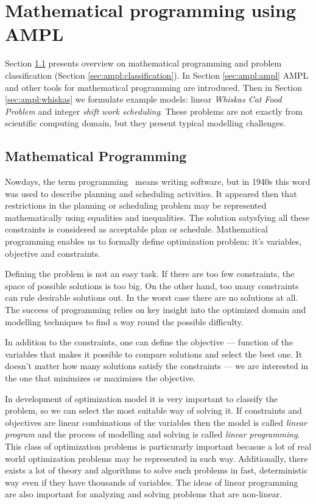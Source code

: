 \chapter{Mathematical programming using AMPL}
\label{chap:ampl} 

Section \ref{sec:ampl:mathprog} presents overview on mathematical programming and problem classification (Section \ref{sec:ampl:classification}). In Section \ref{sec:ampl:ampl} AMPL and other tools for mathematical programming are introduced. Then in Section \ref{sec:ampl:whiskas} we formulate example models: linear \emph{Whiskas Cat Food Problem} and integer \emph{shift work scheduling}. These problems are not exactly from scientific computing domain, but they present typical modelling challenges.

\section{Mathematical Programming}
\label{sec:ampl:mathprog}

Nowdays, the term programming~\cite{Programming} means writing software, but in 1940s this word was used to describe planning and scheduling activities. It appeared then that restrictions in the planning or scheduling problem may be represented mathematically using equalities and inequalities.  The solution satysfying all these constraints is considered as acceptable plan or schedule.  Mathematical programming enables us to formally define optimization problem: it's variables, objective and constraints.

Defining the problem is not an easy task. If there are too few constraints, the space of possible solutions is too big. On the other hand, too many constraints can rule desirable solutions out. In the worst case there are no solutions at all. The success of programming relies on key insight into the optimized domain and modelling techniques to find a way round the possible difficulty. 

In addition to the constraints, one can define the objective --- function of the variables that makes it possible to compare solutions and select the best one. It doesn't matter how many solutions satisfy the constraints --- we are interested in the one that minimizes or maximizes the objective.

In development of optimization model it is very important to classify the problem, so we can select the most suitable way of solving it. If constraints and objectives are linear combinations of the variables then the model is called \emph{linear program} and the process of modelling and solving is called \emph{linear programming}. This class of optimization problems is particurarly important becasue a lot of real world optimization problems may be represented in such way. Additionally, there exists a lot of theory and algorithms to solve such problems in fast, deterministic way even if they have thousands of variables. The ideas of linear programming are also important for analyzing and solving problems that are non-linear.

